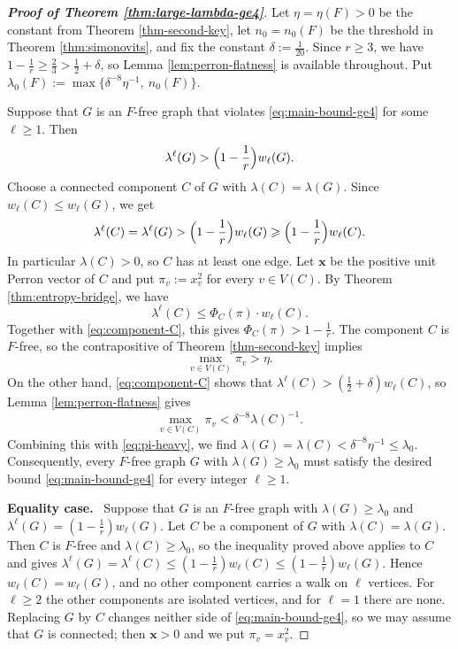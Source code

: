 \documentclass[11pt, a4paper]{article}
\theoremstyle{definition}
\theoremstyle{plain}
\renewcommand{\le}{\leqslant}
\renewcommand{\ge}{\geqslant}
\begin{document}
\begin{proof}[{\bf Proof of Theorem
\ref{thm:large-lambda-ge4}}]
Let $\eta =\eta (F)>0$ be the constant from Theorem
\ref{thm-second-key}, let $n_0=n_0(F)$ be the threshold in
Theorem \ref{thm:simonovits}, and fix the constant 
$\delta :=\frac1{20}$. Since
$r\ge 3$, we have $1-\frac1r\ge \frac23>\frac12+\delta$,
so Lemma \ref{lem:perron-flatness} is available
throughout. Put 
$\lambda_0(F):=\max \{\delta^{-8}\eta^{-1} ,\ n_0(F)\}$.

\smallskip
Suppose that $G$ is an $F$-free graph that violates
\eqref{eq:main-bound-ge4} for some $\ell \ge 1$.  Then
\[  \lambda^{\ell}(G)
  >\Bigl(1-\frac1r\Bigr)w_\ell (G). \]
Choose a
connected component $C$ of $G$ with
$\lambda (C)=\lambda (G)$. Since
$w_\ell (C)\le w_\ell (G)$, we get 
\begin{equation}\label{eq:component-C}
  \lambda^{\ell}(C)=\lambda^{\ell}(G)
  >\Bigl(1-\frac1r\Bigr)w_\ell (G)
   \ge \Bigl(1-\frac1r\Bigr)w_\ell (C).
\end{equation}
In particular $\lambda (C)>0$, so $C$ has at least one
edge. Let $\bm{x}$ be the positive unit Perron vector of
$C$ and put $\pi_v:=x_v^2$ for every $v\in V(C)$. By
Theorem \ref{thm:entropy-bridge}, we have
$$\lambda^\ell (C)\le \Phi_C(\pi ) \cdot w_\ell (C).$$ 
Together with \eqref{eq:component-C}, this gives $\Phi_C(\pi )>1-\frac1r$. The
component $C$ is $F$-free, so the contrapositive of
Theorem \ref{thm-second-key} implies
\begin{equation}\label{eq:pi-heavy}
  \max_{v\in V(C)}\pi_v>\eta .
\end{equation}
On the other hand, \eqref{eq:component-C} shows that
$\lambda^{\ell}(C)>(\frac12+\delta )w_\ell (C)$, 
so Lemma \ref{lem:perron-flatness} gives
$$\max_{v\in V(C)}\pi_v< \delta^{-8} \lambda (C)^{-1}.$$ 
Combining this with
\eqref{eq:pi-heavy}, we find
$\lambda (G)=\lambda (C)< \delta^{-8} \eta^{-1} \le \lambda_0$.
Consequently, every $F$-free graph $G$ with
$\lambda (G)\ge \lambda_0$ must satisfy the desired bound 
\eqref{eq:main-bound-ge4} for every integer $\ell \ge 1$.

\smallskip
\noindent
{\bf Equality case.}~
Suppose that $G$ is an $F$-free graph with
$\lambda (G)\ge \lambda_0$ and
$\lambda^\ell (G)=(1-\frac1r)w_\ell (G)$. Let $C$ be a
component of $G$ with $\lambda (C)=\lambda (G)$. Then $C$
is $F$-free and $\lambda (C)\ge \lambda_0$, so the
inequality proved above applies to $C$ and gives
$\lambda^\ell (G)=\lambda^\ell (C)\le
(1-\frac1r)w_\ell (C)\le (1-\frac1r)w_\ell (G)$. Hence
$w_\ell (C)=w_\ell (G)$, and no other component carries a
walk on $\ell$ vertices. For $\ell \ge 2$ the other
components are isolated vertices, and for $\ell =1$ there
are none. Replacing $G$ by $C$ changes neither side of
\eqref{eq:main-bound-ge4}, so we may assume that $G$ is
connected; then $\bm{x}>0$ and we put $\pi_v=x_v^2$.


\end{proof}
\end{document}
